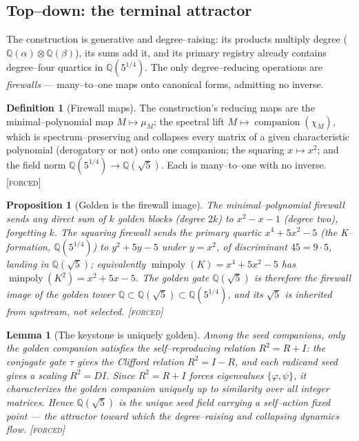 \documentclass[11pt]{article}
\theoremstyle{plain}
\newtheorem{proposition}[theorem]{Proposition}
\newtheorem{lemma}[theorem]{Lemma}
\theoremstyle{definition}
\newtheorem{definition}[theorem]{Definition}
\theoremstyle{remark}
\newcommand{\forced}{\textcolor{forcedc}{\textsc{[forced]}}}
\newcommand{\Q}{\mathbb{Q}}
\begin{document}
\subsection{Top--down: the terminal attractor}\label{ssec:topdown}

The construction is generative and degree--raising: its products multiply degree ($\Q(\alpha)\otimes\Q(\beta)$), its sums add it, and its primary registry already contains degree--four quartics in $\Q(5^{1/4})$. The only degree--reducing operations are \emph{firewalls} --- many--to--one maps onto canonical forms, admitting no inverse.

\begin{definition}[Firewall maps]\label{def:firewall}
The construction's reducing maps are the minimal--polynomial map $M\mapsto\mu_M$; the spectral lift $M\mapsto\operatorname{companion}(\chi_M)$, which is spectrum--preserving and collapses every matrix of a given characteristic polynomial (derogatory or not) onto one companion; the squaring $x\mapsto x^2$; and the field norm $\Q(5^{1/4})\to\Q(\sqrt5)$. Each is many--to--one with no inverse. \forced
\end{definition}

\begin{proposition}[Golden is the firewall image]\label{prop:firewallimage}
The minimal--polynomial firewall sends any direct sum of $k$ golden blocks (degree $2k$) to $x^2-x-1$ (degree two), forgetting $k$. The squaring firewall sends the primary quartic $x^4+5x^2-5$ (the K--formation, $\Q(5^{1/4})$) to $y^2+5y-5$ under $y=x^2$, of discriminant $45=9\cdot5$, landing in $\Q(\sqrt5)$; equivalently $\operatorname{minpoly}(K)=x^4+5x^2-5$ has $\operatorname{minpoly}(K^2)=x^2+5x-5$. The golden gate $\Q(\sqrt5)$ is therefore the firewall image of the golden tower $\Q\subset\Q(\sqrt5)\subset\Q(5^{1/4})$, and its $\sqrt5$ is \emph{inherited} from upstream, not selected. \forced
\end{proposition}

\begin{lemma}[The keystone is uniquely golden]\label{lem:keystone}
Among the seed companions, only the golden companion satisfies the self--reproducing relation $R^2=R+I$: the conjugate gate $\tau$ gives the Clifford relation $R^2=I-R$, and each radicand seed gives a scaling $R^2=DI$. Since $R^2=R+I$ forces eigenvalues $\{\varphi,\psi\}$, it characterizes the golden companion uniquely up to similarity over all integer matrices. Hence $\Q(\sqrt5)$ is the unique seed field carrying a self--action fixed point --- the attractor toward which the degree--raising and collapsing dynamics flow. \forced
\end{lemma}
\end{document}
